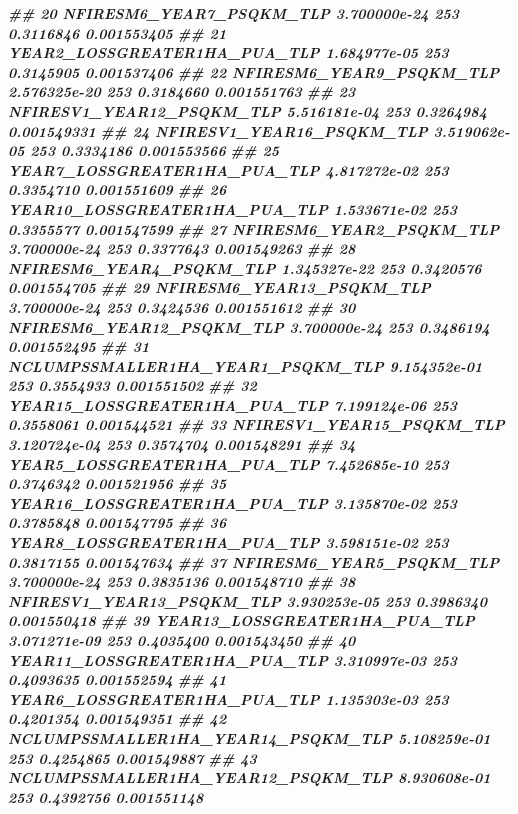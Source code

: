 \documentclass[10pt,landscape,a3paper]{article}
\newenvironment{Shaded}{\begin{snugshade}}{\end{snugshade}}
\newcommand{\DocumentationTok}[1]{\textcolor[rgb]{0.56,0.35,0.01}{\textbf{\textit{#1}}}}
\begin{document}
\begin{Shaded}
\begin{Highlighting}[]
\DocumentationTok{\#\# 20           NFIRESM6\_YEAR7\_PSQKM\_TLP 3.700000e{-}24    253 0.3116846 0.001553405}
\DocumentationTok{\#\# 21       YEAR2\_LOSSGREATER1HA\_PUA\_TLP 1.684977e{-}05    253 0.3145905 0.001537406}
\DocumentationTok{\#\# 22           NFIRESM6\_YEAR9\_PSQKM\_TLP 2.576325e{-}20    253 0.3184660 0.001551763}
\DocumentationTok{\#\# 23          NFIRESV1\_YEAR12\_PSQKM\_TLP 5.516181e{-}04    253 0.3264984 0.001549331}
\DocumentationTok{\#\# 24          NFIRESV1\_YEAR16\_PSQKM\_TLP 3.519062e{-}05    253 0.3334186 0.001553566}
\DocumentationTok{\#\# 25       YEAR7\_LOSSGREATER1HA\_PUA\_TLP 4.817272e{-}02    253 0.3354710 0.001551609}
\DocumentationTok{\#\# 26      YEAR10\_LOSSGREATER1HA\_PUA\_TLP 1.533671e{-}02    253 0.3355577 0.001547599}
\DocumentationTok{\#\# 27           NFIRESM6\_YEAR2\_PSQKM\_TLP 3.700000e{-}24    253 0.3377643 0.001549263}
\DocumentationTok{\#\# 28           NFIRESM6\_YEAR4\_PSQKM\_TLP 1.345327e{-}22    253 0.3420576 0.001554705}
\DocumentationTok{\#\# 29          NFIRESM6\_YEAR13\_PSQKM\_TLP 3.700000e{-}24    253 0.3424536 0.001551612}
\DocumentationTok{\#\# 30          NFIRESM6\_YEAR12\_PSQKM\_TLP 3.700000e{-}24    253 0.3486194 0.001552495}
\DocumentationTok{\#\# 31  NCLUMPSSMALLER1HA\_YEAR1\_PSQKM\_TLP 9.154352e{-}01    253 0.3554933 0.001551502}
\DocumentationTok{\#\# 32      YEAR15\_LOSSGREATER1HA\_PUA\_TLP 7.199124e{-}06    253 0.3558061 0.001544521}
\DocumentationTok{\#\# 33          NFIRESV1\_YEAR15\_PSQKM\_TLP 3.120724e{-}04    253 0.3574704 0.001548291}
\DocumentationTok{\#\# 34       YEAR5\_LOSSGREATER1HA\_PUA\_TLP 7.452685e{-}10    253 0.3746342 0.001521956}
\DocumentationTok{\#\# 35      YEAR16\_LOSSGREATER1HA\_PUA\_TLP 3.135870e{-}02    253 0.3785848 0.001547795}
\DocumentationTok{\#\# 36       YEAR8\_LOSSGREATER1HA\_PUA\_TLP 3.598151e{-}02    253 0.3817155 0.001547634}
\DocumentationTok{\#\# 37           NFIRESM6\_YEAR5\_PSQKM\_TLP 3.700000e{-}24    253 0.3835136 0.001548710}
\DocumentationTok{\#\# 38          NFIRESV1\_YEAR13\_PSQKM\_TLP 3.930253e{-}05    253 0.3986340 0.001550418}
\DocumentationTok{\#\# 39      YEAR13\_LOSSGREATER1HA\_PUA\_TLP 3.071271e{-}09    253 0.4035400 0.001543450}
\DocumentationTok{\#\# 40      YEAR11\_LOSSGREATER1HA\_PUA\_TLP 3.310997e{-}03    253 0.4093635 0.001552594}
\DocumentationTok{\#\# 41       YEAR6\_LOSSGREATER1HA\_PUA\_TLP 1.135303e{-}03    253 0.4201354 0.001549351}
\DocumentationTok{\#\# 42 NCLUMPSSMALLER1HA\_YEAR14\_PSQKM\_TLP 5.108259e{-}01    253 0.4254865 0.001549887}
\DocumentationTok{\#\# 43 NCLUMPSSMALLER1HA\_YEAR12\_PSQKM\_TLP 8.930608e{-}01    253 0.4392756 0.001551148}

\end{Highlighting}
\end{Shaded}
\end{document}
